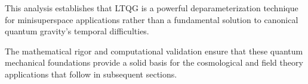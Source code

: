 This analysis establishes that LTQG is a powerful deparameterization technique for minisuperspace applications rather than a fundamental solution to canonical quantum gravity's temporal difficulties.

The mathematical rigor and computational validation ensure that these quantum mechanical foundations provide a solid basis for the cosmological and field theory applications that follow in subsequent sections.